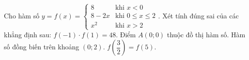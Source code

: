\begin{ex}
Cho hàm số $y=f(x)=\begin{cases}8 & \text{khi } x<0\\ 8-2x & \text{khi } 0\le x\le2\\ x^2 & \text{khi } x>2\end{cases}$. Xét tính đúng sai của các khẳng định sau:
\choiceTF
{\True $f(-1)\cdot f(1)=48$.}
{Điểm $A(0;0)$ thuộc đồ thị hàm số.}
{Hàm số đồng biến trên khoảng $(0;2)$.}
{$f\left(\dfrac32\right)=f(5)$.}
\end{ex}
